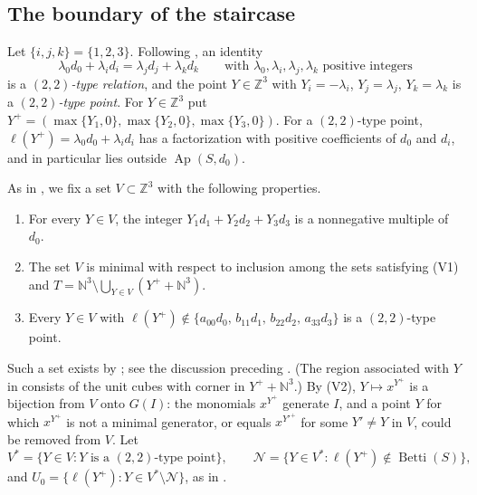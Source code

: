 \documentclass{amsart}
\theoremstyle{definition}
\theoremstyle{remark}
\numberwithin{equation}{section}
\newcommand{\N}{\mathbb{N}}
\newcommand{\Z}{\mathbb{Z}}
\newcommand{\Ap}{\operatorname{Ap}}
\DeclareMathOperator{\Betti}{Betti}
\newcommand{\wt}{\ell}
\newcommand{\Apd}{\Ap(S,d_0)}
\begin{document}
\subsection{The boundary of the staircase}

Let $\{i,j,k\}=\{1,2,3\}$. Following \cite[Section~2.2]{Cho26}, an identity
\begin{equation}\label{eq:22}
\lambda_0d_0+\lambda_id_i=\lambda_jd_j+\lambda_kd_k\qquad\text{with } \lambda_0,\lambda_i,\lambda_j,\lambda_k \text{ positive integers}
\end{equation}
is a \emph{$(2,2)$-type relation}, and the point $Y\in\Z^3$ with $Y_i=-\lambda_i$, $Y_j=\lambda_j$, $Y_k=\lambda_k$ is a \emph{$(2,2)$-type point}. For $Y\in\Z^3$ put $Y^+=(\max\{Y_1,0\},\max\{Y_2,0\},\max\{Y_3,0\})$. For a $(2,2)$-type point, $\wt(Y^+)=\lambda_0d_0+\lambda_id_i$ has a factorization with positive coefficients of $d_0$ and $d_i$, and in particular lies outside $\Apd$.

As in \cite[Section~3]{Cho26}, we fix a set $V\subset\Z^3$ with the following properties.
\begin{enumerate}[(V1)]
\item For every $Y\in V$, the integer $Y_1d_1+Y_2d_2+Y_3d_3$ is a nonnegative multiple of $d_0$.
\item The set $V$ is minimal with respect to inclusion among the sets satisfying (V1) and $T=\N^3\setminus\bigcup_{Y\in V}(Y^++\N^3)$.
\item Every $Y\in V$ with $\wt(Y^+)\notin\{a_{00}d_0,\,b_{11}d_1,\,b_{22}d_2,\,a_{33}d_3\}$ is a $(2,2)$-type point.
\end{enumerate}
Such a set exists by \cite[Theorem~2.4]{Cho26}; see the discussion preceding \cite[Remark~3.2]{Cho26}. (The region associated with $Y$ in \cite{Cho26} consists of the unit cubes with corner in $Y^++\N^3$.) By (V2), $Y\mapsto x^{Y^+}$ is a bijection from $V$ onto $G(I)$: the monomials $x^{Y^+}$ generate $I$, and a point $Y$ for which $x^{Y^+}$ is not a minimal generator, or equals $x^{Y'^+}$ for some $Y'\neq Y$ in $V$, could be removed from $V$. Let
\[
V^*=\{Y\in V : Y \text{ is a } (2,2)\text{-type point}\},\qquad \mathcal N=\{Y\in V^* : \wt(Y^+)\notin\Betti(S)\},
\]
and $U_0=\{\wt(Y^+) : Y\in V^*\setminus\mathcal N\}$, as in \cite[Section~4.2]{Cho26}.
\end{document}
